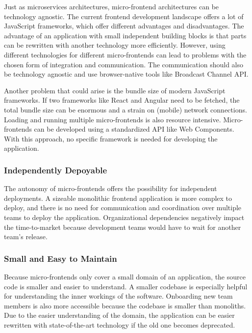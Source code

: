 Just as microservices architectures, micro-frontend architectures can be technology agnostic. The current frontend development landscape offers a lot of JavaScript frameworks, which offer different advantages and disadvantages. The advantage of an application with small independent building blocks is that parts can be rewritten with another technology more efficiently. \cite[14-16]{book:2020:geers:background:micro-frontends:micro-frontends-in-action} However, using different technologies for different micro-frontends can lead to problems with the chosen form of integration and communication. The communication should also be technology agnostic and use browser-native tools like Broadcast Channel API.

\bigskip

\noindent Another problem that could arise is the bundle size of modern JavaScript frameworks. If two frameworks like React and Angular need to be fetched, the total bundle size can be enormous and a strain on (mobile) network connections. Loading and running multiple micro-frontends is also resource intensive. Micro-frontends can be developed using a standardized API like Web Components. With this approach, no specific framework is needed for developing the application. \cite{book:2020:geers:background:micro-frontends:micro-frontends-in-action}

\subsubsection{Independently Depoyable}

The autonomy of micro-frontends offers the possibility for independent deployments. A sizeable monolithic frontend application is more complex to deploy, and there is no need for communication and coordination over multiple teams to deploy the application. Organizational dependencies negatively impact the time-to-market because development teams would have to wait for another team's release. \cite[12]{book:2020:geers:background:micro-frontends:micro-frontends-in-action}

\subsubsection{Small and Easy to Maintain}

Because micro-frontends only cover a small domain of an application, the source code is smaller and easier to understand. A smaller codebase is especially helpful for understanding the inner workings of the software. Onboarding new team members is also more accessible because the codebase is smaller than monoliths.
Due to the easier understanding of the domain, the application can be easier rewritten with state-of-the-art technology if the old one becomes deprecated. \cite{book:2020:geers:background:micro-frontends:micro-frontends-in-action}

